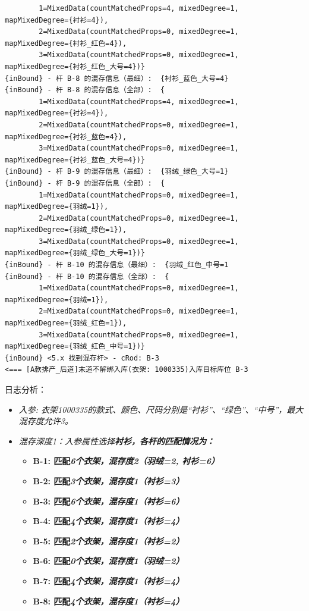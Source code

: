 \begin{enumerate}[leftmargin=32pt,label=\bf{增强\Roman*.}]
\begin{itemize}
{\begin{verbatim}
		1=MixedData(countMatchedProps=4, mixedDegree=1, mapMixedDegree={衬衫=4}), 
		2=MixedData(countMatchedProps=0, mixedDegree=1, mapMixedDegree={衬衫_红色=4}), 
		3=MixedData(countMatchedProps=0, mixedDegree=1, mapMixedDegree={衬衫_红色_大号=4})}
{inBound} - 杆 B-8 的混存信息（最细）:  {衬衫_蓝色_大号=4}
{inBound} - 杆 B-8 的混存信息（全部）:  {
		1=MixedData(countMatchedProps=4, mixedDegree=1, mapMixedDegree={衬衫=4}), 
		2=MixedData(countMatchedProps=0, mixedDegree=1, mapMixedDegree={衬衫_蓝色=4}), 
		3=MixedData(countMatchedProps=0, mixedDegree=1, mapMixedDegree={衬衫_蓝色_大号=4})}
{inBound} - 杆 B-9 的混存信息（最细）:  {羽绒_绿色_大号=1}
{inBound} - 杆 B-9 的混存信息（全部）:  {
		1=MixedData(countMatchedProps=0, mixedDegree=1, mapMixedDegree={羽绒=1}), 
		2=MixedData(countMatchedProps=0, mixedDegree=1, mapMixedDegree={羽绒_绿色=1}), 
		3=MixedData(countMatchedProps=0, mixedDegree=1, mapMixedDegree={羽绒_绿色_大号=1})}
{inBound} - 杆 B-10 的混存信息（最细）:  {羽绒_红色_中号=1
{inBound} - 杆 B-10 的混存信息（全部）:  {
		1=MixedData(countMatchedProps=0, mixedDegree=1, mapMixedDegree={羽绒=1}), 
		2=MixedData(countMatchedProps=0, mixedDegree=1, mapMixedDegree={羽绒_红色=1}), 
		3=MixedData(countMatchedProps=0, mixedDegree=1, mapMixedDegree={羽绒_红色_中号=1})}
{inBound} <5.x 找到混存杆> - cRod: B-3
<=== [A款排产_后道]末道不解绑入库(衣架: 1000335)入库目标库位 B-3
		\end{verbatim}
		}
		日志分析：
		\begin{itemize}
			\item \it{入参}: 衣架1000335的款式、颜色、尺码分别是“衬衫”、“绿色”、“中号”，最大混存度允许3。
			\item \it{混存深度1}：入参属性选择\bf{衬衫}，各杆的匹配情况为：
			\begin{itemize}
				\item \bf{B-1}:  匹配\it{6}个衣架，混存度2（羽绒=2, 衬衫=6）
				\item \bf{B-2}:  匹配\it{3}个衣架，混存度1（衬衫=3）
				\item \bf{B-3}:  匹配\it{6}个衣架，混存度1（衬衫=6）
				\item \bf{B-4}:  匹配\it{4}个衣架，混存度1（衬衫=4）
				\item \bf{B-5}:  匹配\it{2}个衣架，混存度1（衬衫=2）
				\item \bf{B-6}:  匹配\it{0}个衣架，混存度1（羽绒=2）
				\item \bf{B-7}:  匹配\it{4}个衣架，混存度1（衬衫=4）
				\item \bf{B-8}:  匹配\it{4}个衣架，混存度1（衬衫=4）

\end{itemize}
\end{itemize}
\end{itemize}
\end{enumerate}
